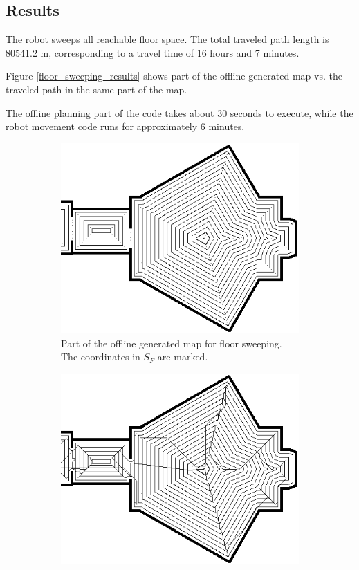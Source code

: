 \subsection{Results}
The robot sweeps all reachable floor space.
The total traveled path length is 80541.2 m, corresponding to a travel time of 16 hours and 7 minutes.

Figure \ref{floor_sweeping_results} shows part of the offline generated map vs. the traveled path in the same part of the map.

The offline planning part of the code takes about 30 seconds to execute,
while the robot movement code runs for approximately 6 minutes.

\begin{figure}[ht]
\centering
  \begin{subfigure}[t]{0.3\textwidth}
    \includegraphics[width = \textwidth]{graphics/floor_sweep_plan}
    \caption{Part of the offline generated map for floor sweeping. The coordinates in \(S_{F}\) are marked.}
    \label{floor_sweep_plan}
  \end{subfigure}
  \begin{subfigure}[t]{0.3\textwidth}
    \includegraphics[width = \textwidth]{graphics/floor_sweep_robot}

\end{subfigure}
\end{figure}

